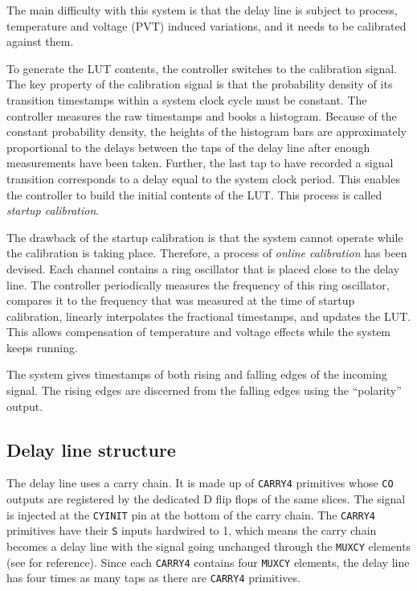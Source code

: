 \documentclass[a4paper,11pt]{article}
\begin{document}
The main difficulty with this system is that the delay line is subject to process, temperature and voltage (PVT) induced variations, and it needs to be calibrated against them.

To generate the LUT contents, the controller switches to the calibration signal. The key property of the calibration signal is that the probability density of its transition timestamps within a system clock cycle must be constant. The controller measures the raw timestamps and books a histogram. Because of the constant probability density, the heights of the histogram bars are approximately proportional to the delays between the taps of the delay line after enough measurements have been taken. Further, the last tap to have recorded a signal transition corresponds to a delay equal to the system clock period. This enables the controller to build the initial contents of the LUT. This process is called \textit{startup calibration}.

The drawback of the startup calibration is that the system cannot operate while the calibration is taking place. Therefore, a process of \textit{online calibration} has been devised. Each channel contains a ring oscillator that is placed close to the delay line. The controller periodically measures the frequency of this ring oscillator, compares it to the frequency that was measured at the time of startup calibration, linearly interpolates the fractional timestamps, and updates the LUT. This allows compensation of temperature and voltage effects while the system keeps running.

The system gives timestamps of both rising and falling edges of the incoming signal. The rising edges are discerned from the falling edges using the ``polarity'' output.

\subsection{Delay line structure}
The delay line uses a carry chain. It is made up of \verb!CARRY4! primitives whose \verb!CO! outputs are registered by the dedicated D flip flops of the same slices. The signal is injected at the \verb!CYINIT! pin at the bottom of the carry chain. The \verb!CARRY4! primitives have their \verb!S! inputs hardwired to 1, which means the carry chain becomes a delay line with the signal going unchanged through the \verb!MUXCY! elements (see \cite{s6hdl} for reference). Since each \verb!CARRY4! contains four \verb!MUXCY! elements, the delay line has four times as many taps as there are \verb!CARRY4! primitives.
\end{document}
